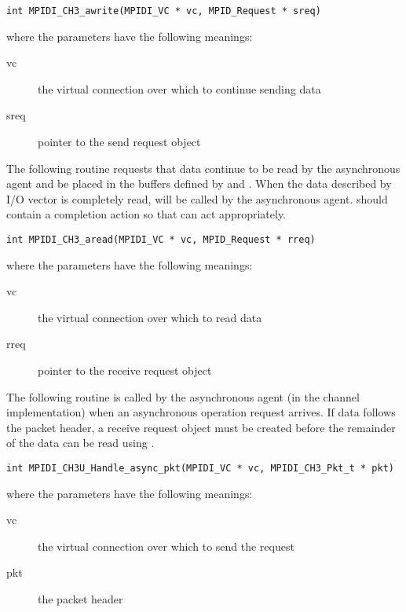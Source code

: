 \documentclass{article}
\begin{document}
\begin{verbatim}
int MPIDI_CH3_awrite(MPIDI_VC * vc, MPID_Request * sreq)
\end{verbatim}
where the parameters have the following meanings:
\begin{description}
\item[vc]the virtual connection over which to continue sending data

\item[sreq]pointer to the send request object
\end{description}

The following routine requests that data continue to be read by the
asynchronous agent and be placed in the buffers defined by
 and 
.  When the data described by I/O vector is
completely 
read,  will be called by the asynchronous
agent.   should contain a completion action so that
 can act appropriately.

\begin{verbatim}
int MPIDI_CH3_aread(MPIDI_VC * vc, MPID_Request * rreq)
\end{verbatim}
where the parameters have the following meanings:
\begin{description}
\item[vc]the virtual connection over which to read data

\item[rreq]pointer to the receive request object
\end{description}

The following routine is called by the asynchronous agent (in the channel
implementation) when an asynchronous operation request arrives.  If data
follows the packet header, a receive request object must be created before
the remainder of the data can be read using .

\begin{verbatim}
int MPIDI_CH3U_Handle_async_pkt(MPIDI_VC * vc, MPIDI_CH3_Pkt_t * pkt)
\end{verbatim}
where the parameters have the following meanings:
\begin{description}
\item[vc]the virtual connection over which to send the request

\item[pkt]the packet header
\end{description}
\end{document}
